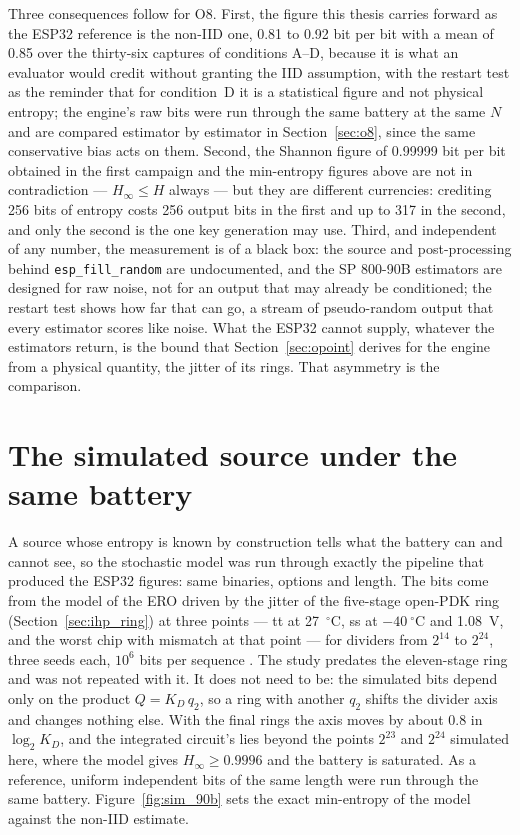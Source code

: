 Three consequences follow for O8. First, the figure this thesis carries
forward as the ESP32 reference is the non-IID one, 0.81 to 0.92 bit per
bit with a mean of 0.85 over the thirty-six captures of conditions A--D,
because it is what an evaluator would credit without granting the
IID assumption, with the restart test as the reminder that for
condition~D it is a statistical figure and not physical entropy; the engine's raw bits
were run through the same battery at the same $N$ and are compared
estimator by estimator in Section~\ref{sec:o8}, since the same
conservative bias acts on them. Second, the Shannon figure of
0.99999 bit per bit obtained in the first campaign and the
min-entropy figures above are not in contradiction --- $H_\infty \le H$
always --- but they are different currencies: crediting 256 bits of
entropy costs 256 output bits in the first and up to 317 in the second,
and only the second is the one key generation may use. Third, and
independent of any number, the measurement is of a black box: the source
and post-processing behind \texttt{esp\_fill\_random} are undocumented,
and the SP 800-90B estimators are designed for raw noise, not for an
output that may already be conditioned; the restart test shows how far
that can go, a stream of pseudo-random output that every estimator scores
like noise. What the ESP32 cannot supply,
whatever the estimators return, is the bound that Section~\ref{sec:opoint}
derives for the engine from a physical quantity, the jitter of its
rings. That asymmetry is the
comparison.

\section{The simulated source under the same battery}
\label{sec:sim_90b}

A source whose entropy is known by construction tells what the battery
can and cannot see, so the stochastic model was run through exactly the
pipeline that produced the ESP32 figures: same binaries, options and
length. The bits come from the model of the \ac{ERO} driven by the jitter
of the five-stage open-\ac{PDK} ring (Section~\ref{sec:ihp_ring}) at
three points --- tt at 27~$^\circ$C, ss at $-40~^\circ$C and 1.08~V, and
the worst chip with mismatch at that point --- for dividers from $2^{14}$
to $2^{24}$, three seeds each, $10^6$ bits per sequence \simu{}. The
study predates the eleven-stage ring and was not repeated with it. It
does not need to be: the simulated bits depend only on the product
$Q = K_D\,q_2$, so a ring with another $q_2$ shifts the divider axis and
changes nothing else. With the final rings the axis moves by about 0.8 in
$\log_2 K_D$, and the integrated circuit's  lies beyond the
points $2^{23}$ and $2^{24}$ simulated here, where the model gives
$H_\infty \ge 0.9996$ and the battery is saturated. As a reference, uniform independent bits of the same
length were run through the same battery. Figure~\ref{fig:sim_90b} sets
the exact min-entropy of the model against the non-IID estimate.


